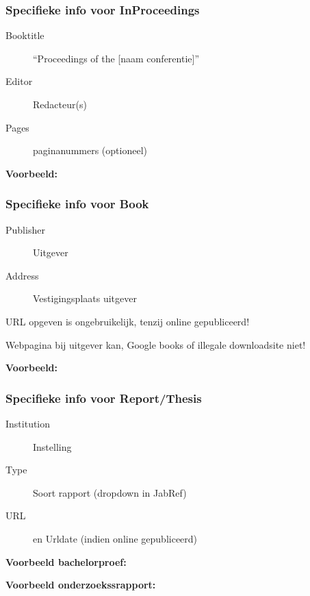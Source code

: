 \documentclass[aspectratio=169]{beamer}
\begin{document}
\begin{frame}[plain]
  \frametitle{Specifieke info voor InProceedings}

  \begin{description}
    \item[Booktitle] ``Proceedings of the [naam conferentie]''
    \item[Editor] Redacteur(s)
    \item[Pages] paginanummers (optioneel)
  \end{description}

  \medskip

  \textbf{Voorbeeld:}

\end{frame}

\begin{frame}[plain]
  \frametitle{Specifieke info voor Book}

  \begin{description}
    \item[Publisher] Uitgever
    \item[Address] Vestigingsplaats uitgever
  \end{description}

  \medskip

  URL opgeven is ongebruikelijk, tenzij online gepubliceerd!
  
  Webpagina bij uitgever kan, Google books of illegale downloadsite niet!

  \medskip

  \textbf{Voorbeeld:}

\end{frame}

\begin{frame}
  \frametitle{Specifieke info voor Report/Thesis}

  \begin{description}
    \item[Institution] Instelling
    \item[Type] Soort rapport (dropdown in JabRef)
    \item[URL]  en Urldate (indien online gepubliceerd)
  \end{description}

\end{frame}

\begin{frame}[plain]

  \textbf{Voorbeeld bachelorproef:}


  \medskip

  \textbf{Voorbeeld onderzoekssrapport:}


\end{frame}
\end{document}
